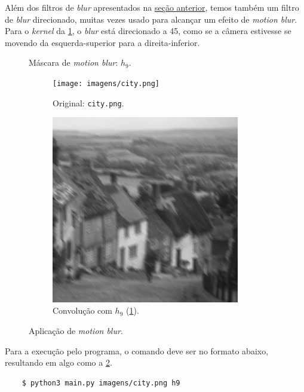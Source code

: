 
Além dos filtros de \textit{blur} apresentados na \hyperref[sec:blur]{seção anterior}, temos também um filtro de \textit{blur} direcionado, muitas vezes usado para alcançar um efeito de \textit{motion blur}. Para o \textit{kernel} da \cref{fig:h9}, o \textit{blur} está direcionado a 45\textdegree, como se a câmera estivesse se movendo da esquerda-superior para a direita-inferior.

\begin{figure}[H]
    \centering
    

    \caption{Máscara de \textit{motion blur}: $h_9$.}
    \label{fig:h9}
\end{figure}

\begin{figure}[H]
    \centering
    \begin{subfigure}{0.48\textwidth}
        \centering
        \texttt{[image: imagens/city.png]}
        \caption{Original: \texttt{city.png}.}
    \end{subfigure}%
    \begin{subfigure}{0.48\textwidth}
        \centering
        \includegraphics[width=0.9\textwidth]{resultados/city_h9.png}
        \caption{Convolução com $h_9$ (\ref{fig:h9}).}
        \label{fig:motion:conv}
    \end{subfigure}

    \caption{Aplicação de \textit{motion blur}.}
    \label{fig:motion}
\end{figure}

Para a execução pelo programa, o comando deve ser no formato abaixo, resultando em algo como a \cref{fig:motion:conv}.

\begin{verbatim}
    $ python3 main.py imagens/city.png h9
\end{verbatim}

